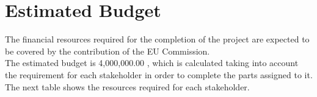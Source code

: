 \section{Estimated Budget}

The financial resources required for the completion of the project are expected to be covered by the contribution of the EU Commission.\\

The estimated budget is 4,000,000.00 \EUR, which is calculated taking into account the requirement for each stakeholder in order to complete the parts assigned to it. The next table shows the resources required for each stakeholder.



